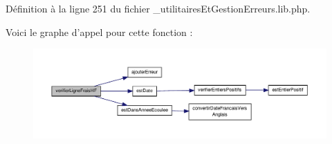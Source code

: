 Définition à la ligne 251 du fichier \-\_\-utilitaires\-Et\-Gestion\-Erreurs.\-lib.\-php.



Voici le graphe d'appel pour cette fonction \-:\nopagebreak
\begin{figure}[H]
\begin{center}
\leavevmode
\includegraphics[width=350pt]{__utilitaires_et_gestion_erreurs_8lib_8php_add1850973a586302c7fab9e20bd1dd25_cgraph}
\end{center}
\end{figure}


